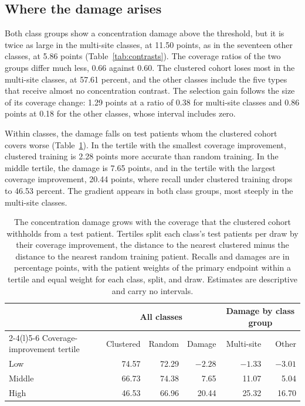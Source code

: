 \subsection{Where the damage arises}
\label{sec:damage-location}
Both class groups show a concentration damage above the threshold, but it is twice as large in the multi-site classes, at 11.50 points, as in the seventeen other classes, at 5.86 points (Table~\ref{tab:contrasts}). The coverage ratios of the two groups differ much less, 0.66 against 0.60. The clustered cohort loses most in the multi-site classes, at 57.61 percent, and the other classes include the five types that receive almost no concentration contrast. The selection gain follows the size of its coverage change: 1.29 points at a ratio of 0.38 for multi-site classes and 0.86 points at 0.18 for the other classes, whose interval includes zero.

Within classes, the damage falls on test patients whom the clustered cohort covers worse (Table~\ref{tab:tertiles}). In the tertile with the smallest coverage improvement, clustered training is 2.28 points more accurate than random training. In the middle tertile, the damage is 7.65 points, and in the tertile with the largest coverage improvement, 20.44 points, where recall under clustered training drops to 46.53 percent. The gradient appears in both class groups, most steeply in the multi-site classes.

\begin{table}[htbp]
\centering
\small
\renewcommand{\arraystretch}{1.15}
\begin{tabular}{@{}lrrrrr@{}}
\toprule
 & \multicolumn{3}{c}{All classes} & \multicolumn{2}{c}{Damage by class group} \\
\cmidrule(lr){2-4}\cmidrule(l){5-6}
Coverage-improvement tertile & Clustered & Random & Damage & Multi-site & Other \\
\midrule
Low & 74.57 & 72.29 & $-2.28$ & $-1.33$ & $-3.01$ \\
Middle & 66.73 & 74.38 & 7.65 & 11.07 & 5.04 \\
High & 46.53 & 66.96 & 20.44 & 25.32 & 16.70 \\
\bottomrule
\end{tabular}
\caption{The concentration damage grows with the coverage that the clustered cohort withholds from a test patient. Tertiles split each class's test patients per draw by their coverage improvement, the distance to the nearest clustered minus the distance to the nearest random training patient. Recalls and damages are in percentage points, with the patient weights of the primary endpoint within a tertile and equal weight for each class, split, and draw. Estimates are descriptive and carry no intervals.}
\label{tab:tertiles}
\end{table}

